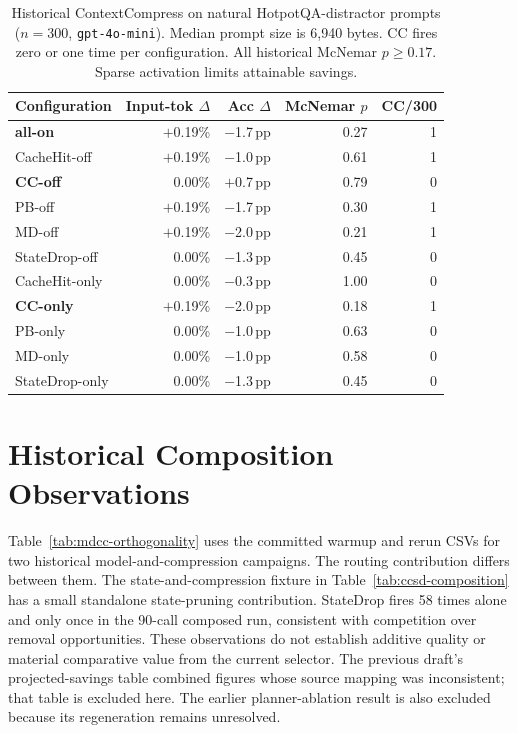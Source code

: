 \begin{table}[t]
\caption{Historical ContextCompress on natural HotpotQA-distractor prompts ($n=300$, \texttt{gpt-4o-mini}). Median prompt size is 6,940 bytes. CC fires zero or one time per configuration. All historical McNemar $p\geq0.17$. Sparse activation limits attainable savings.}
\label{tab:hotpot-matrix}
\small
\begin{tabularx}{\columnwidth}{@{} X r r r r @{}}
\toprule
Configuration & \makecell[r]{Input-tok\\$\Delta$} & Acc $\Delta$ & McNemar $p$ & CC/300 \\
\midrule
\textbf{all-on}              & $+$0.19\% & $-$1.7\,pp & 0.27 & 1 \\
CacheHit-off                 & $+$0.19\% & $-$1.0\,pp & 0.61 & 1 \\
\textbf{CC-off} & $\phantom{+}$0.00\% & $+$0.7\,pp & 0.79 & 0 \\
PB-off           & $+$0.19\% & $-$1.7\,pp & 0.30 & 1 \\
MD-off           & $+$0.19\% & $-$2.0\,pp & 0.21 & 1 \\
StateDrop-off                & $\phantom{+}$0.00\% & $-$1.3\,pp & 0.45 & 0 \\
\midrule
CacheHit-only                & $\phantom{+}$0.00\% & $-$0.3\,pp & 1.00 & 0 \\
\textbf{CC-only}& $+$0.19\% & $-$2.0\,pp & 0.18 & 1 \\
PB-only          & $\phantom{+}$0.00\% & $-$1.0\,pp & 0.63 & 0 \\
MD-only          & $\phantom{+}$0.00\% & $-$1.0\,pp & 0.58 & 0 \\
StateDrop-only               & $\phantom{+}$0.00\% & $-$1.3\,pp & 0.45 & 0 \\
\bottomrule
\end{tabularx}
\end{table}


\section{Historical Composition Observations}
\label{sec:composition}

Table~\ref{tab:mdcc-orthogonality} uses the committed warmup and rerun CSVs
for two historical model-and-compression campaigns. The routing contribution differs
between them. The state-and-compression fixture in Table~\ref{tab:ccsd-composition}
has a small standalone state-pruning contribution. StateDrop fires 58 times alone
and only once in the 90-call composed run, consistent with competition over removal
opportunities. These observations do not establish additive quality or material
comparative value from the current selector. The previous draft's projected-savings
table combined figures whose source mapping was inconsistent; that table is excluded
here. The earlier planner-ablation result is also excluded because its regeneration
remains unresolved.

